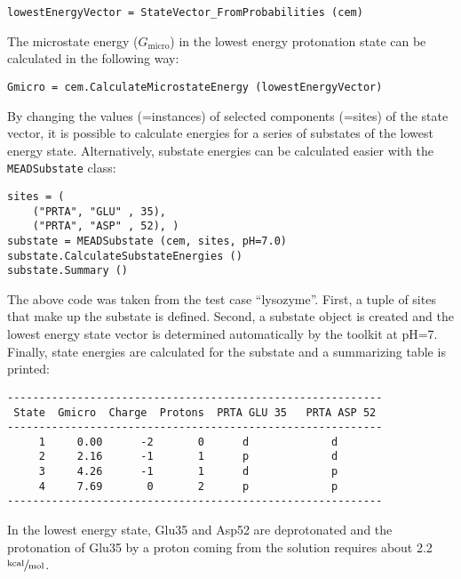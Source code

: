 \documentclass[12pt]{article}
\newcommand{\kcal}{$\sfrac{\rm kcal}{\rm mol}$\xspace}
\begin{document}
{{\footnotesize \singlespacing \begin{lstlisting}
lowestEnergyVector = StateVector_FromProbabilities (cem)
\end{lstlisting} }

\bigskip
The microstate energy ($G_{\mathrm{micro}}$) in the lowest energy protonation state can
be calculated in the following way:

{\footnotesize \singlespacing \begin{lstlisting}
Gmicro = cem.CalculateMicrostateEnergy (lowestEnergyVector)
\end{lstlisting} }

\bigskip
By changing the values (=instances) of selected components (=sites) of the state vector,
it is possible to calculate energies for a series of substates of
the lowest energy state.
%
Alternatively,
substate energies can be calculated easier with the \texttt{MEADSubstate} class:

{\footnotesize \singlespacing \begin{lstlisting}
sites = (
    ("PRTA", "GLU" , 35),
    ("PRTA", "ASP" , 52), )
substate = MEADSubstate (cem, sites, pH=7.0)
substate.CalculateSubstateEnergies ()
substate.Summary ()
\end{lstlisting} }

\bigskip
The above code was taken from the test case ``lysozyme''.
%
First,
a tuple of sites that make up the substate is defined.
%
Second,
a substate object is created and the lowest energy state vector is determined
automatically by the toolkit at pH=7.
%
Finally,
state energies are calculated for the substate and a summarizing table is
printed:

{\footnotesize \singlespacing \begin{lstlisting}
-----------------------------------------------------------
 State  Gmicro  Charge  Protons  PRTA GLU 35   PRTA ASP 52
-----------------------------------------------------------
     1     0.00      -2       0      d             d
     2     2.16      -1       1      p             d
     3     4.26      -1       1      d             p
     4     7.69       0       2      p             p
-----------------------------------------------------------
\end{lstlisting} }

\bigskip
In the lowest energy state,
Glu35 and Asp52 are deprotonated
and the protonation of Glu35 by a proton coming from the solution
requires about 2.2 \kcal.


}
\end{document}
